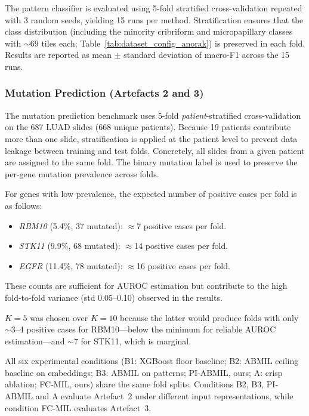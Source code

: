 The pattern classifier is evaluated using 5-fold stratified cross-validation
repeated with 3 random seeds, yielding 15 runs per method.
Stratification ensures that the class distribution (including the minority
cribriform and micropapillary classes with $\sim$69 tiles each;
Table~\ref{tab:dataset_config_anorak}) is preserved in each fold.
Results are reported as mean $\pm$ standard deviation of macro-F1 across the
15 runs.

\subsubsection{Mutation Prediction (Artefacts 2 and 3)}

The mutation prediction benchmark uses 5-fold \emph{patient}-stratified
cross-validation on the 687 LUAD slides (668 unique patients).
Because 19 patients contribute more than one slide, stratification is applied
at the patient level to prevent data leakage between training and test folds.
Concretely, all slides from a given patient are assigned to the same fold.
The binary mutation label is used to preserve the per-gene mutation prevalence
across folds.

For genes with low prevalence, the expected number of positive cases per fold
is as follows:
\begin{itemize}
    \item \textit{RBM10} (5.4\%, 37 mutated): $\approx$7 positive cases per fold.
    \item \textit{STK11} (9.9\%, 68 mutated): $\approx$14 positive cases per fold.
    \item \textit{EGFR} (11.4\%, 78 mutated): $\approx$16 positive cases per fold.
\end{itemize}

These counts are sufficient for AUROC estimation but contribute to the
high fold-to-fold variance (std 0.05--0.10) observed in the results.

$K = 5$ was chosen over $K = 10$ because the latter would produce folds
with only $\sim$3--4 positive cases for RBM10---below the minimum for
reliable AUROC estimation---and $\sim$7 for STK11, which is marginal.

All six experimental conditions (B1: XGBoost floor baseline;
B2: ABMIL ceiling baseline on embeddings; B3: ABMIL on patterns;
PI-ABMIL, ours; A: crisp ablation; FC-MIL, ours) share the same
fold splits.
Conditions B2, B3, PI-ABMIL and A evaluate Artefact~2 under different
input representations, while condition FC-MIL evaluates Artefact~3.

